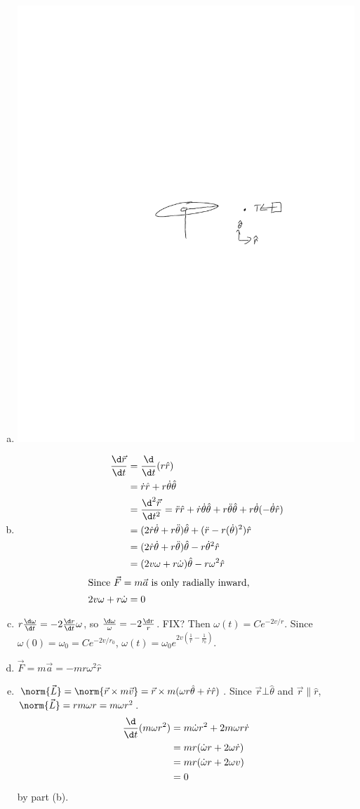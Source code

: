 \documentclass{esg8012pset}
\begin{document}
\begin{solution}
  \begin{enumerate}[a)]
    \item \includegraphics[width=.5\textwidth]{2009-10-02_Diagram_5_0}
    \item \begin{align*}
      \frac{\d \vec r}{\d t} & = \frac{\d}{\d t}(r \hat r) \\
       & = \dot r \hat r + r\dot\theta \hat\theta \\
       & = \frac{\d^2 \vec r}{\d t^2} = \ddot r\hat r + \dot r\dot\theta \hat \theta + r \ddot\theta\hat\theta + r\dot\theta(-\dot\theta\hat r) \\
       & = (2\dot r\dot\theta + r\ddot\theta)\hat\theta +(\ddot r - r(\dot\theta)^2)\hat r \\
       & = (2\dot r\dot\theta + r\ddot\theta)\hat\theta - r\dot\theta^2\hat r \\
       & = (2v\omega + r\dot\omega)\hat\theta - r\omega^2\hat r \\
       \intertext{Since $\vec F = m \vec a$ is only radially inward,}
       2v\omega + r\dot \omega & = 0 
    \end{align*}
    \item $r\frac{\d \omega}{\d t} = -2 \frac{\d r}{\d t}\omega$, so $\frac{\d \omega}{\omega} = -2\frac{\d r}{r}$.  FIX? Then $\omega(t) = C e^{-2v / r}$.   Since $\omega(0) = \omega_0 = Ce^{-2v/r_0}$, $\omega(t) = \omega_0 e^{2v\left(\frac{1}{r} - \frac{1}{r_0}\right)}$.
    \item $\vec F = m\vec a = -mr\omega^2\hat r$
    \item $\norm{\vec L} = \norm{\vec r\times m \vec v} = \vec r\times m(\omega r\hat\theta + \dot r\hat r)$.  Since $\vec r \bot \hat\theta$ and $\vec r \| \hat r$, $\norm{\vec L} = rm\omega r = m\omega r^2$.  \begin{align*}
     \frac{\d }{\d t}(m \omega r^2) & = m\dot\omega r^2 + 2m\omega r\dot r \\
      & = m r(\dot\omega r + 2\omega\dot r) \\
      & = m r(\dot \omega r + 2\omega v) \\
      & = 0
      \end{align*} by part (b).
  \end{enumerate}
\end{solution}
\end{document}
